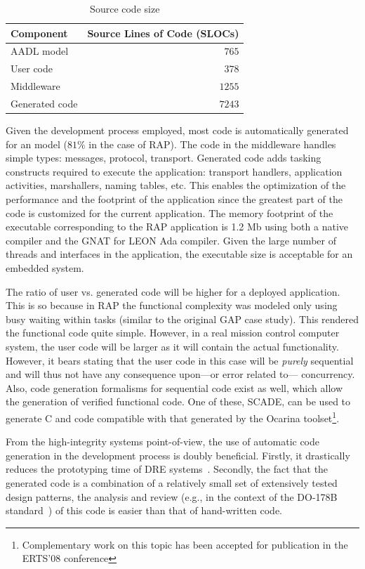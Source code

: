\begin{table}
\centering
\begin{tabular}{|l|r|}
\hline
\textbf{Component} & \textbf{Source Lines of Code (SLOCs)}\\
\hline
AADL model         & $765$\\
User code          & $378$\\
Middleware         & $1255$\\
Generated code     & $7243$\\
\hline
\end{tabular}
\caption{Source code size}
\label{SLOCs}
\end{table}

Given the development process employed, most code is automatically
generated for an \aadl{} model ($81\%$ in the case of RAP). The code
in the middleware handles simple types: messages, protocol,
transport. Generated code adds tasking constructs required to execute
the application: transport handlers, application activities,
marshallers, naming tables, etc. This enables the optimization of the
performance and the footprint of the application since the greatest
part of the code is customized for the current application. The memory
footprint of the executable corresponding to the RAP application is
1.2 Mb using both a native \ada compiler and the GNAT for LEON Ada
compiler. Given the large number of threads and interfaces in the
application, the executable size is acceptable for an embedded system.

The ratio of user vs. generated code will be higher for a deployed
application. This is so because in RAP the functional complexity was
modeled only using busy waiting within tasks (similar to the original
GAP case study). This rendered the functional code quite
simple. However, in a real mission control computer system, the user
code will be larger as it will contain the actual
functionality. However, it bears stating that the user code in this
case will be \emph{purely} sequential and will thus not have any
consequence upon---or error related to--- concurrency. Also, code
generation formalisms for sequential code exist as well, which allow
the generation of verified functional code. One of these, SCADE, can
be used to generate C and \ada code compatible with that generated by
the Ocarina toolset\footnote{Complementary work on this topic has been
  accepted for publication in the ERTS'08 conference}.

From the high-integrity systems point-of-view, the use of automatic
code generation in the development process is doubly
beneficial. Firstly, it drastically reduces the prototyping time of
DRE systems~\cite{hugues@rsp07}. Secondly, the fact that the generated
code is a combination of a relatively small set of extensively tested
design patterns, the analysis and review (e.g., in the context of the
DO-178B standard~\cite{do178b}) of this code is easier than that of
hand-written code.


